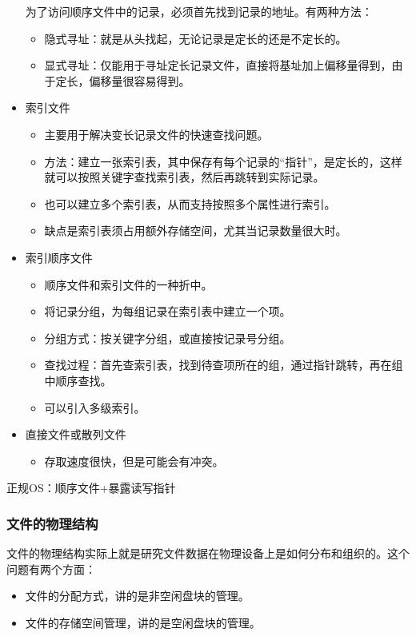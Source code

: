 \documentclass[12pt, a4paper, oneside]{ctexart}
\begin{document}
\begin{itemize}
  为了访问顺序文件中的记录，必须首先找到记录的地址。有两种方法：
  \begin{itemize}
    \item 隐式寻址：就是从头找起，无论记录是定长的还是不定长的。
    \item 显式寻址：仅能用于寻址定长记录文件，直接将基址加上偏移量得到，由于定长，偏移量很容易得到。
  \end{itemize}
  \item 索引文件
  \begin{itemize}
    \item 主要用于解决变长记录文件的快速查找问题。
    \item 方法：建立一张索引表，其中保存有每个记录的“指针”，是定长的，这样就可以按照关键字查找索引表，然后再跳转到实际记录。
    \item 也可以建立多个索引表，从而支持按照多个属性进行索引。
    \item 缺点是索引表须占用额外存储空间，尤其当记录数量很大时。
  \end{itemize}
  \item 索引顺序文件
  \begin{itemize}
    \item 顺序文件和索引文件的一种折中。
    \item 将记录分组，为每组记录在索引表中建立一个项。
    \item 分组方式：按关键字分组，或直接按记录号分组。
    \item 查找过程：首先查索引表，找到待查项所在的组，通过指针跳转，再在组中顺序查找。
    \item 可以引入多级索引。
  \end{itemize}
  \item 直接文件或散列文件
  \begin{itemize}
    \item 存取速度很快，但是可能会有冲突。
  \end{itemize}
\end{itemize}

正规OS：顺序文件+暴露读写指针

\subsubsection{文件的物理结构}

文件的物理结构实际上就是研究文件数据在物理设备上是如何分布和组织的。这个问题有两个方面：
\begin{itemize}
  \item 文件的分配方式，讲的是非空闲盘块的管理。
  \item 文件的存储空间管理，讲的是空闲盘块的管理。
\end{itemize}
\end{document}

